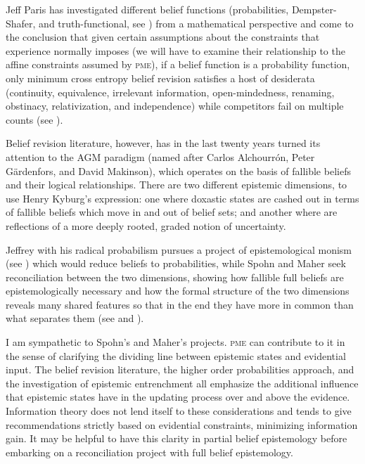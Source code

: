\documentclass[phd,12pt,oneside]{ubcthesis}
\begin{document}
Jeff Paris has investigated different belief functions (probabilities,
Dempster-Shafer, and truth-functional, see ) from
a mathematical perspective and come to the conclusion that given
certain assumptions about the constraints that experience normally
imposes (we will have to examine their relationship to the affine
constraints assumed by \textsc{pme}), if a belief function is a
probability function, only minimum cross entropy belief revision
satisfies a host of desiderata (continuity, equivalence, irrelevant
information, open-mindedness, renaming, obstinacy, relativization, and
independence) while competitors fail on multiple counts (see
).

Belief revision literature, however, has in the last twenty years
turned its attention to the AGM paradigm (named after Carlos
Alchourr{\'o}n, Peter G{\"a}rdenfors, and David Makinson), which
operates on the basis of fallible beliefs and their logical
relationships. There are two different epistemic dimensions, to use
Henry Kyburg's expression: one where doxastic states are cashed out in
terms of fallible beliefs which move in and out of belief sets; and
another where  are reflections of a more deeply rooted,
graded notion of uncertainty.

Jeffrey with his radical probabilism pursues a project of
epistemological monism (see ) which would reduce
beliefs to probabilities, while Spohn and Maher seek reconciliation
between the two dimensions, showing how fallible full beliefs are
epistemologically necessary and how the formal structure of the two
dimensions reveals many shared features so that in the end they have
more in common than what separates them (see 
and ).

I am sympathetic to Spohn's and Maher's projects. \textsc{pme} can
contribute to it in the sense of clarifying the dividing line between
epistemic states and evidential input. The belief revision literature,
the higher order probabilities approach, and the investigation of
epistemic entrenchment all emphasize the additional influence that
epistemic states have in the updating process over and above the
evidence. Information theory does not lend itself to these
considerations and tends to give recommendations strictly based on
evidential constraints, minimizing information gain. It may be helpful
to have this clarity in partial belief epistemology before embarking
on a reconciliation project with full belief epistemology.
\end{document}
